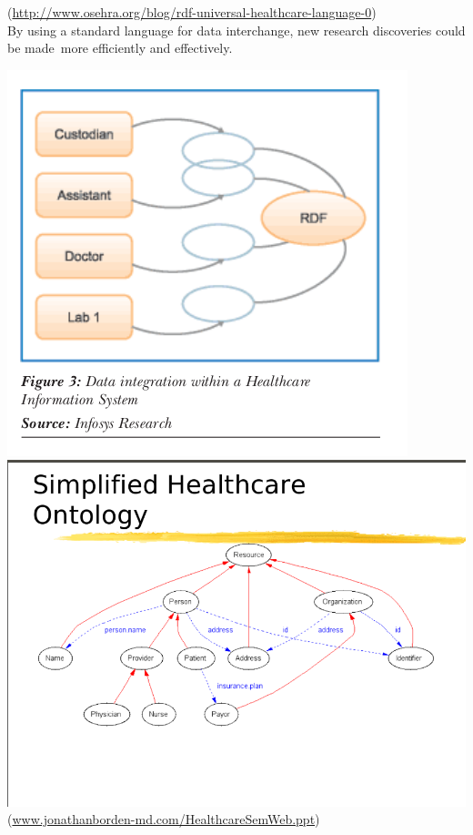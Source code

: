 \documentclass[DIV=calc, paper=a4, fontsize=12pt, onecolumn]{scrartcl}	 %
\begin{document}
 (\url{http://www.osehra.org/blog/rdf-universal-healthcare-language-0})\\

By using a standard language for data interchange, new research discoveries could be made\
more efficiently and effectively.\

\includegraphics[scale=0.65]{rdfh.png}
 \citep{parachuri2008role}\\

\includegraphics[scale=0.4]{rdf1.png}\\
 (\url{www.jonathanborden-md.com/HealthcareSemWeb.ppt‎})\\
\end{document}
